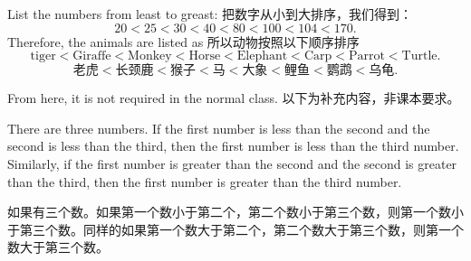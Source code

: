 \begin{solution}
List the numbers from least to greast: 把数字从小到大排序，我们得到：
$$
20<25<30<40<80<100<104<170.
$$ 
Therefore, the animals are listed as 所以动物按照以下顺序排序
$$
\text{tiger} < \text{Giraffe} < \text{Monkey} < \text{Horse} < \text{Elephant} < \text{Carp} < \text{Parrot} < \text{Turtle}.
$$
$$
\text{老虎} < \text{长颈鹿} < \text{猴子} < \text{马} < \text{大象} < \text{鲤鱼} < \text{鹦鹉} < \text{乌龟}.
$$
\end{solution}

\begin{note}
From here, it is not required in the normal class. 以下为补充内容，非课本要求。
\end{note}

\begin{newprop}
There are three numbers. If the first number is less than the second and the second is less than the third, then the first number is less than the third number.
Similarly, if the first number is greater than the second and the second is greater than the third, then the first number is greater than the third number.

如果有三个数。如果第一个数小于第二个，第二个数小于第三个数，则第一个数小于第三个数。同样的如果第一个数大于第二个，第二个数大于第三个数，则第一个数大于第三个数。
\end{newprop}


